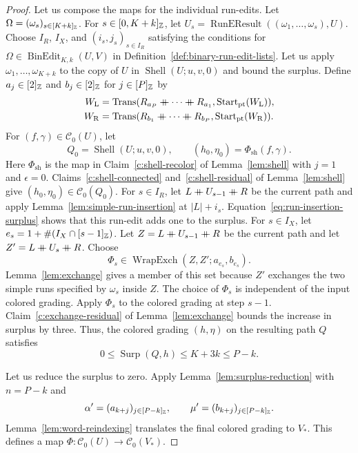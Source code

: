 \begin{proof}
 Let us compose the maps for the individual run-edits.
Let $\Omega=(\omega_s)_{s\in[K+k]_{\mathbb Z}}$.
For $s\in[0,K+k]_{\mathbb Z}$, let $U_s=\operatorname{RunEResult}((\omega_1,\ldots,\omega_s),U)$.
Choose $I_R$, $I_X$, and $(i_s,j_s)_{s\in I_R}$ satisfying the conditions for $\Omega\in\operatorname{BinEdit}_{K,k}(U,V)$ in Definition~\ref{def:binary-run-edit-lists}.
Let us apply $\omega_1,\ldots,\omega_{K+k}$ to the copy of $U$ in $\operatorname{Shell}(U;u,v,0)$ and bound the surplus.
Define $a_j\in[2]_{\mathbb Z}$ and $b_j\in[2]_{\mathbb Z}$ for $j\in[P]_{\mathbb Z}$ by
\[
\begin{aligned}
 W_{\mathrm L}&=\operatorname{Trans}(R_{a_P}\ccn \cdots\ccn R_{a_1},\operatorname{Start}_{\mathrm{pt}}(W_{\mathrm L})),\\
 W_{\mathrm R}&=\operatorname{Trans}(R_{b_1}\ccn \cdots\ccn R_{b_P},\operatorname{Start}_{\mathrm{pt}}(W_{\mathrm R})).
\end{aligned}
\]
For $(f,\gamma)\in\mathcal C_0(U)$, let
\[
 Q_0=\operatorname{Shell}(U;u,v,0),\qquad
 (h_0,\eta_0)=\Phi_{\mathrm{sh}}(f,\gamma).
\]
Here $\Phi_{\mathrm{sh}}$ is the map in Claim~\ref{c:shell-recolor} of Lemma~\ref{lem:shell} with $j=1$ and $\epsilon=0$.
Claims~\ref{c:shell-connected} and~\ref{c:shell-residual} of Lemma~\ref{lem:shell} give $(h_0,\eta_0)\in\mathcal C_0(Q_0)$.
For $s\in I_R$, let $L\mathbin{+\mkern-10mu+} U_{s-1}\mathbin{+\mkern-10mu+} R$ be the current path and apply Lemma~\ref{lem:simple-run-insertion} at $|L|+i_s$.
Equation~\eqref{eq:run-insertion-surplus} shows that this run-edit adds one to the surplus.
For $s\in I_X$, let $e_s=1+\#(I_X\cap[s-1]_{\mathbb Z})$.
Let $Z=L\mathbin{+\mkern-10mu+} U_{s-1}\mathbin{+\mkern-10mu+} R$ be the current path and let $Z'=L\mathbin{+\mkern-10mu+} U_s\mathbin{+\mkern-10mu+} R$.
Choose
\[
 \Phi_s\in\operatorname{WrapExch}(Z,Z';a_{e_s},b_{e_s}).
\]
Lemma~\ref{lem:exchange} gives a member of this set because $Z'$ exchanges the two simple runs specified by $\omega_s$ inside $Z$.
The choice of $\Phi_s$ is independent of the input colored grading.
Apply $\Phi_s$ to the colored grading at step $s-1$.
Claim~\ref{c:exchange-residual} of Lemma~\ref{lem:exchange} bounds the increase in surplus by three.
Thus, the colored grading $(h,\eta)$ on the resulting path $Q$ satisfies
\[
 0\le\operatorname{Surp}(Q,h)\le K+3k\le P-k.
\]

Let us reduce the surplus to zero.
Apply Lemma~\ref{lem:surplus-reduction} with $n=P-k$ and
\[
 \alpha'=(a_{k+j})_{j\in[P-k]_{\mathbb Z}},\qquad
 \mu'=(b_{k+j})_{j\in[P-k]_{\mathbb Z}}.
\]
Lemma~\ref{lem:word-reindexing} translates the final colored grading to $V_*$.
This defines a map $\Phi\colon\mathcal C_0(U)\to\mathcal C_0(V_*)$.


\end{proof}

